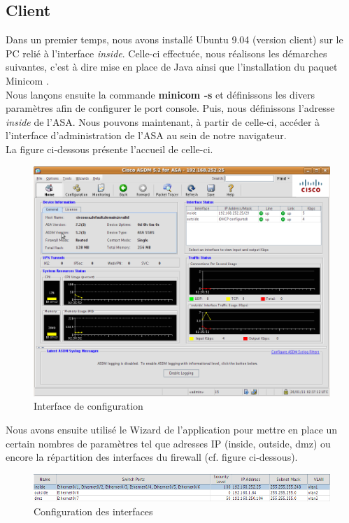 \documentclass[a4paper,12pt]{article}
\begin{document}
\subsection{Client}
Dans un premier temps, nous avons installé Ubuntu 9.04 (version client) sur le PC relié à l'interface \textit{inside}. Celle-ci effectuée, nous réalisons les démarches suivantes, c'est à dire mise en place de Java ainsi que l'installation du paquet \og Minicom \fg.\\
Nous lançons ensuite la commande \textbf{minicom -s} et définissons les divers paramètres afin de configurer le port console. Puis, nous définissons l'adresse \textit{inside} de l'ASA. Nous pouvons maintenant, à partir de celle-ci, accéder à l'interface d'administration de l'ASA au sein de notre navigateur.\\La figure ci-dessous présente l'accueil de celle-ci. 

\begin{figure}[H]
	\center
	\includegraphics[width=15cm]{img/1-Interfaceconfigfw.png}
	\caption{Interface de configuration}
\end{figure}

Nous avons ensuite utilisé le \og Wizard \fg de l'application pour mettre en place un certain nombres de paramètres tel que adresses IP (inside, outside, dmz) ou encore la répartition des interfaces du firewall (cf. figure ci-dessous). 
\begin{figure}[H]
	\center
	\includegraphics[width=15cm]{img/2-Interfaces.png}
	\caption{Configuration des interfaces}
\end{figure}
\end{document}
